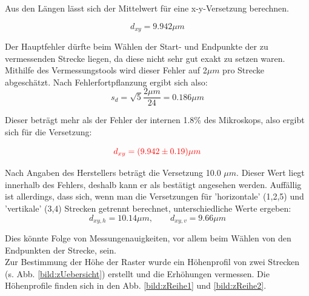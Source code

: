 Aus den Längen lässt sich der Mittelwert für eine x-y-Versetzung berechnen.

\begin{equation*}
    d_{xy} = 9.942 \mu m
\end{equation*}

Der Hauptfehler dürfte beim Wählen der Start- und Endpunkte 
der zu vermessenden Strecke liegen, da diese nicht sehr gut exakt zu setzen waren. Mithilfe des Vermessungstools wird dieser Fehler auf 
2$\mu m$ pro Strecke abgeschätzt. Nach Fehlerfortpflanzung ergibt sich also:
\begin{equation*}
    s_d = \sqrt{5}\frac{2 \mu m}{24} = 0.186 \mu m
\end{equation*}

Dieser beträgt mehr als der Fehler der internen 1.8\% des Mikroskops, also ergibt sich für die Versetzung:

\begin{equation*}
    \textcolor{red}{d_{xy} = (9.942 \pm 0.19) \mu m}
\end{equation*}

Nach Angaben des Herstellers beträgt die Versetzung 10.0 $\mu m$. Dieser Wert liegt innerhalb des Fehlers, deshalb kann er als 
bestätigt angesehen werden. Auffällig ist allerdings, dass sich, wenn man die Versetzungen für 'horizontale' (1,2,5) und 'vertikale' 
(3,4) Strecken getrennt berechnet, unterschiedliche Werte ergeben: 
\begin{equation*}
    d_{xy,h} = 10.14 \mu m, \qquad d_{xy,v} = 9.66 \mu m
\end{equation*}

Dies könnte Folge von Messungenauigkeiten, vor allem beim Wählen von den Endpunkten der Strecke, sein. 
\\

Zur Bestimmung der Höhe der Raster wurde ein Höhenprofil von zwei Strecken (s. Abb. \ref{bild:zUebersicht}) erstellt und die Erhöhungen 
vermessen. Die Höhenprofile finden sich in den Abb. \ref{bild:zReihe1} und \ref{bild:zReihe2}. 

